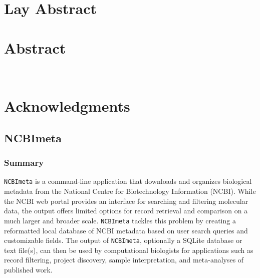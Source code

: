 \documentclass[
]{article}
\begin{document}
\chapter{Lay Abstract}


\chapter{Abstract}


\newpage
\null\vfill
\begin{center}
\textsl{ \\ }
\end{center}
\vfill
	
\chapter{Acknowledgments}

\newpage

\doublespacing
\tableofcontents

\newpage
\addvspace{10pt}
\let\saveaddvspace=\addvspace
\def\addvspace#1{}
\listoffigures
\let\addvspace=\saveaddvspace

\newpage
\addvspace{10pt}
\let\saveaddvspace=\addvspace
\def\addvspace#1{}
\listoftables
\let\addvspace=\saveaddvspace
\label{NumPrefacePages}
\newpage

\hypersetup{pageanchor=true}
\doublespacing


\hypertarget{ncbimeta}{%
\section{NCBImeta}\label{ncbimeta}}

\hypertarget{sec:summary}{%
\subsection{Summary}\label{sec:summary}}

\texttt{NCBImeta} is a command-line application that downloads and
organizes biological metadata from the National Centre for Biotechnology
Information (NCBI). While the NCBI web portal provides an interface for
searching and filtering molecular data, the output offers limited
options for record retrieval and comparison on a much larger and broader
scale. \texttt{NCBImeta} tackles this problem by creating a reformatted
local database of NCBI metadata based on user search queries and
customizable fields. The output of \texttt{NCBImeta}, optionally a
SQLite database or text file(s), can then be used by computational
biologists for applications such as record filtering, project discovery,
sample interpretation, and meta-analyses of published work.
\end{document}
